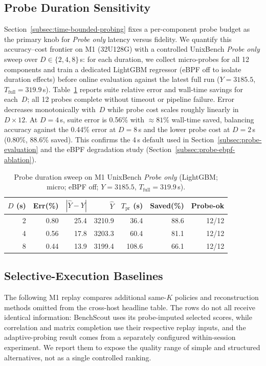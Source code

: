 \documentclass[sigconf, review, anonymous, balance=false]{acmart}
\begin{document}
\subsection{Probe Duration Sensitivity}
\label{subsec:probe-duration-sensitivity}

Section~\ref{subsec:time-bounded-probing} fixes a per-component probe budget as the primary knob for \emph{Probe only} latency versus fidelity.
We quantify this accuracy--cost frontier on M1 (32U128G) with a controlled UnixBench \emph{Probe only} sweep over $D \in \{2,4,8\}$\,s: for each duration, we collect micro-probes for all 12 components and train a dedicated LightGBM regressor (eBPF off to isolate duration effects) before online evaluation against the latest full run ($Y{=}3185.5$, $T_{\mathrm{full}}{=}319.9$\,s).
Table~\ref{tab:probe-duration-sensitivity} reports suite relative error and wall-time savings for each~$D$; all 12 probes complete without timeout or pipeline failure.
Error decreases monotonically with~$D$ while probe cost scales roughly linearly in $D{\times}12$. At $D{=}4$\,s, suite error is 0.56\% with ${\approx}81\%$ wall-time saved, balancing accuracy against the 0.44\% error at $D{=}8$\,s and the lower probe cost at $D{=}2$\,s (0.80\%, 88.6\% saved).
This confirms the 4\,s default used in Section~\ref{subsec:probe-evaluation} and the eBPF degradation study (Section~\ref{subsec:probe-ebpf-ablation}).

\begin{table}[t]
\centering
\caption{Probe duration sweep on M1 UnixBench \emph{Probe only} (LightGBM; micro; eBPF off; $Y{=}3185.5$, $T_{\mathrm{full}}{=}319.9$\,s).}
\label{tab:probe-duration-sensitivity}
\small
\begin{tabular*}{\columnwidth}{@{\extracolsep{\fill}}rrrrrrr@{}}
\toprule
$D$ (s) & \textbf{Err(\%)} & $|\hat{Y}{-}Y|$ & $\hat{Y}$ & $T_{\mathrm{pr}}$ (s) & \textbf{Saved(\%)} & \textbf{Probe-ok} \\
\midrule
2 & 0.80 & 25.4 & 3210.9 & 36.4 & 88.6 & 12/12 \\
4 & 0.56 & 17.8 & 3203.3 & 60.4 & 81.1 & 12/12 \\
8 & 0.44 & 13.9 & 3199.4 & 108.6 & 66.1 & 12/12 \\
\bottomrule
\end{tabular*}
\end{table}


\subsection{Selective-Execution Baselines}
\label{subsec:selective-execution-baselines}
The following M1 replay compares additional same-$K$ policies and reconstruction methods omitted from the cross-host headline table. The rows do not all receive identical information: BenchScout uses its probe-imputed selected scores, while correlation and matrix completion use their respective replay inputs, and the adaptive-probing result comes from a separately configured within-session experiment. We report them to expose the quality range of simple and structured alternatives, not as a single controlled ranking.
\end{document}
